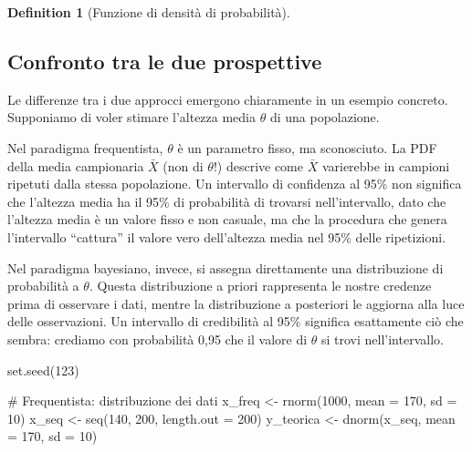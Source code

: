 \documentclass[
  letterpaper,
  DIV=11,
  numbers=noendperiod,
  oneside]{scrreprt}
\newenvironment{Shaded}{\begin{snugshade}}{\end{snugshade}}
\newcommand{\AttributeTok}[1]{\textcolor[rgb]{0.40,0.45,0.13}{#1}}
\newcommand{\CommentTok}[1]{\textcolor[rgb]{0.37,0.37,0.37}{#1}}
\newcommand{\DecValTok}[1]{\textcolor[rgb]{0.68,0.00,0.00}{#1}}
\newcommand{\FunctionTok}[1]{\textcolor[rgb]{0.28,0.35,0.67}{#1}}
\newcommand{\NormalTok}[1]{\textcolor[rgb]{0.00,0.23,0.31}{#1}}
\newcommand{\OtherTok}[1]{\textcolor[rgb]{0.00,0.23,0.31}{#1}}
\theoremstyle{definition}
\theoremstyle{plain}
\theoremstyle{definition}
\newtheorem{definition}{Definition}[chapter]
\theoremstyle{remark}
\begin{document}
\begin{definition}[Funzione di densità di
probabilità]
\subsection{Confronto tra le due
prospettive}\label{confronto-tra-le-due-prospettive}

Le differenze tra i due approcci emergono chiaramente in un esempio
concreto. Supponiamo di voler stimare l'altezza media \(\theta\) di una
popolazione.

Nel paradigma frequentista, \(\theta\) è un parametro fisso, ma
sconosciuto. La PDF della media campionaria \(\bar{X}\) (non di
\(\theta\)!) descrive come \(\bar{X}\) varierebbe in campioni ripetuti
dalla stessa popolazione. Un intervallo di confidenza al 95\% non
significa che l'altezza media ha il 95\% di probabilità di trovarsi
nell'intervallo, dato che l'altezza media è un valore fisso e non
casuale, ma che la procedura che genera l'intervallo ``cattura'' il
valore vero dell'altezza media nel 95\% delle ripetizioni.

Nel paradigma bayesiano, invece, si assegna direttamente una
distribuzione di probabilità a \(\theta\). Questa distribuzione a priori
rappresenta le nostre credenze prima di osservare i dati, mentre la
distribuzione a posteriori le aggiorna alla luce delle osservazioni. Un
intervallo di credibilità al 95\% significa esattamente ciò che sembra:
crediamo con probabilità 0,95 che il valore di \(\theta\) si trovi
nell'intervallo.

\begin{Shaded}
\begin{Highlighting}[]
\FunctionTok{set.seed}\NormalTok{(}\DecValTok{123}\NormalTok{)}

\CommentTok{\# Frequentista: distribuzione dei dati}
\NormalTok{x\_freq }\OtherTok{\textless{}{-}} \FunctionTok{rnorm}\NormalTok{(}\DecValTok{1000}\NormalTok{, }\AttributeTok{mean =} \DecValTok{170}\NormalTok{, }\AttributeTok{sd =} \DecValTok{10}\NormalTok{)}
\NormalTok{x\_seq }\OtherTok{\textless{}{-}} \FunctionTok{seq}\NormalTok{(}\DecValTok{140}\NormalTok{, }\DecValTok{200}\NormalTok{, }\AttributeTok{length.out =} \DecValTok{200}\NormalTok{)}
\NormalTok{y\_teorica }\OtherTok{\textless{}{-}} \FunctionTok{dnorm}\NormalTok{(x\_seq, }\AttributeTok{mean =} \DecValTok{170}\NormalTok{, }\AttributeTok{sd =} \DecValTok{10}\NormalTok{)}


\end{Highlighting}
\end{Shaded}
\end{definition}
\end{document}
